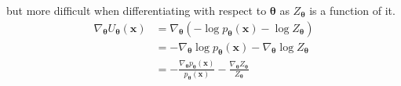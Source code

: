 but more difficult when differentiating with respect to $\bm{\theta}$ as $Z_{\bm{\theta}}$ is a function of it.
\[
\begin{aligned}
	\nabla_{\bm{\theta}} U_{\bm{\theta}} (\bm{x})
	&= \nabla_{\bm{\theta}} ( - \log p_{\bm{\theta}} (\bm{x}) - \log Z_{\bm{\theta}} ) \\
	&=  - \nabla_{\bm{\theta}} \log p_{\bm{\theta}} (\bm{x}) - \nabla_{\bm{\theta}} \log Z_{\bm{\theta}} \\
	&= - \frac{ \nabla_{\bm{\theta}} p_{\bm{\theta}} (\bm{x}) }{ p_{\bm{\theta}} (\bm{x}) } - \frac{ \nabla_{\bm{\theta}} Z_{\bm{\theta}} }{ Z_{\bm{\theta}} }\\
\end{aligned}
\]














